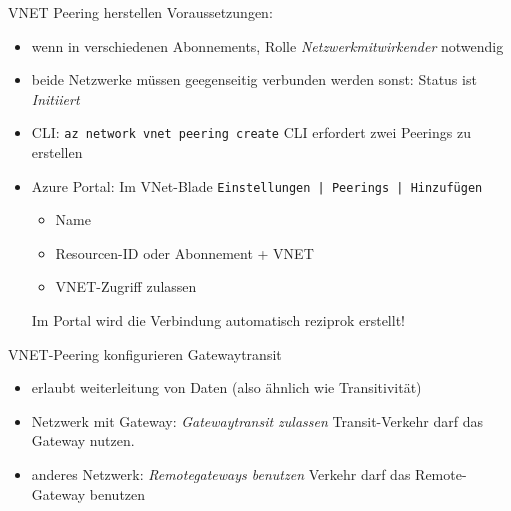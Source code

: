 \begin{flashcard}[Definition]{VNET Peering herstellen}
    Voraussetzungen:
    \begin{itemize}
        \item wenn in verschiedenen Abonnements, Rolle \emph{Netzwerkmitwirkender} notwendig
        \item beide Netzwerke müssen geegenseitig verbunden werden\newline
            sonst: Status ist \emph{Initiiert}
    \end{itemize}

    \begin{itemize}
        \item CLI: \texttt{az network vnet peering create}\newline
            CLI erfordert zwei Peerings zu erstellen
        \item Azure Portal: Im VNet-Blade \texttt{Einstellungen | Peerings | Hinzufügen}
        \begin{itemize}
            \item Name
            \item Resourcen-ID oder Abonnement + VNET
            \item VNET-Zugriff zulassen
        \end{itemize}
        Im Portal wird die Verbindung automatisch reziprok erstellt!
    \end{itemize}

\end{flashcard}

\begin{flashcard}[Definition]{VNET-Peering konfigurieren}
    Gatewaytransit
    \begin{itemize}
        \item erlaubt weiterleitung von Daten (also ähnlich wie Transitivität)
        \item Netzwerk mit Gateway: \emph{Gatewaytransit zulassen}\newline
            Transit-Verkehr darf das Gateway nutzen.
        \item anderes Netzwerk: \emph{Remotegateways benutzen}\newline
            Verkehr darf das Remote-Gateway benutzen
    \end{itemize}
\end{flashcard}

